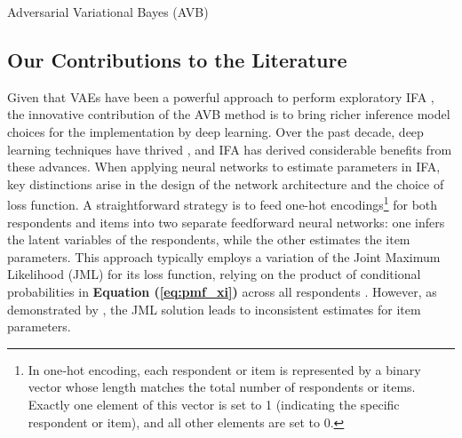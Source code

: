\documentclass[a4paper,12pt]{article}
\theoremstyle{plain} %
\theoremstyle{remark} %
\theoremstyle{definition} %
\begin{document}
\begin{algorithm}[!htb]
\caption{Adversarial Variational Bayes (AVB)}
\SetAlgoLined

\label{alg:avb}
\end{algorithm}

\subsection{Our Contributions to the Literature}
Given that VAEs have been a powerful approach to perform exploratory IFA \citep{urban2021deep}, the innovative contribution of the AVB method is to bring richer inference model choices for the implementation by deep learning. Over the past decade, deep learning techniques have thrived \citep{lecun2015deep}, and IFA has derived considerable benefits from these advances. When applying neural networks to estimate parameters in IFA, key distinctions arise in the design of the network architecture and the choice of loss function. A straightforward strategy is to feed one-hot encodings\footnote{In one‐hot encoding, each respondent or item is represented by a binary vector whose length matches the total number of respondents or items. Exactly one element of this vector is set to 1 (indicating the specific respondent or item), and all other elements are set to 0.} for both respondents and items into two separate feedforward neural networks: one infers the latent variables of the respondents, while the other estimates the item parameters. This approach typically employs a variation of the Joint Maximum Likelihood (JML) for its loss function, relying on the product of conditional probabilities in \textbf{Equation (\ref{eq:pmf_xi})} across all respondents \citep{tsutsumi2021deep,zhang2024neural}. However, as demonstrated by \citet{ghosh1995inconsistent}, the JML solution leads to inconsistent estimates for item parameters.
\end{document}
